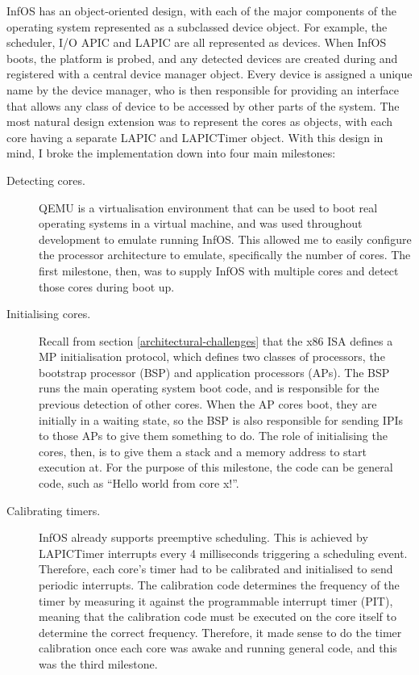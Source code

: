 \documentclass[bsc,frontabs,singlespacing,parskip,deptreport]{infthesis}
\begin{document}
InfOS has an object-oriented design, with each of the major components of the operating system represented as a subclassed device object. For example, the scheduler, I/O APIC and LAPIC are all represented as devices. When InfOS boots, the platform is probed, and any detected devices are created during and registered with a central device manager object. Every device is assigned a unique name by the device manager, who is then responsible for providing an interface that allows any class of device to be accessed by other parts of the system. The most natural design extension was to represent the cores as objects, with each core having a separate LAPIC and LAPICTimer object. With this design in mind, I broke the implementation down into four main milestones:

\begin{description}
\item [Detecting cores.] QEMU \cite{qemu} is a virtualisation environment that can be used to boot real operating systems in a virtual machine, and was used throughout development to emulate running InfOS. This allowed me to easily configure the processor architecture to emulate, specifically the number of cores. The first milestone, then, was to supply InfOS with multiple cores and detect those cores during boot up.

\item [Initialising cores.] Recall from section \ref{architectural-challenges} that the x86 ISA defines a MP initialisation protocol, which defines two classes of processors, the bootstrap processor (BSP) and application processors (APs). The BSP runs the main operating system boot code, and is responsible for the previous detection of other cores. When the AP cores boot, they are initially in a waiting state, so the BSP is also responsible for sending IPIs to those APs to give them something to do. The role of initialising the cores, then, is to give them a stack and a memory address to start execution at. For the purpose of this milestone, the code can be general code, such as “Hello world from core x!”.

\item[Calibrating timers.] InfOS already supports preemptive scheduling. This is achieved by LAPICTimer interrupts every 4 milliseconds triggering a scheduling event. Therefore, each core’s timer had to be calibrated and initialised to send periodic interrupts. The calibration code determines the frequency of the timer by measuring it against the programmable interrupt timer (PIT), meaning that the calibration code must be executed on the core itself to determine the correct frequency. Therefore, it made sense to do the timer calibration once each core was awake and running general code, and this was the third milestone.  


\end{description}
\end{document}
